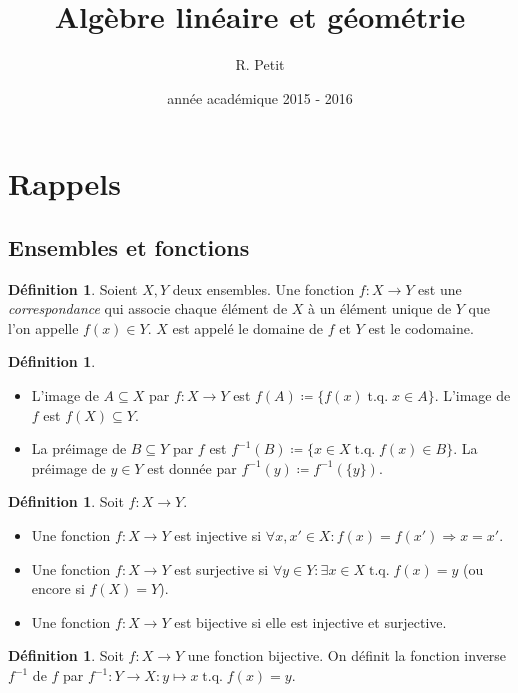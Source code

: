\documentclass{article}
\title{Algèbre linéaire et géométrie}
\author{R. Petit}
\date{année académique 2015 - 2016}
\DeclareMathOperator{\tq}{\text{ t.q. }}
\theoremstyle{definition}
\newtheorem{déf}[thm]{Définition}
\theoremstyle{remark}
\begin{document}
\maketitle
\tableofcontents
\newpage
{}

\section{Rappels}
	\subsection{Ensembles et fonctions}
		\begin{déf} Soient $X, Y$ deux ensembles. Une fonction $f : X \to Y$ est une \textit{correspondance} qui associe chaque élément de $X$ à un élément unique de $Y$
		que l'on appelle $f(x) \in Y$. $X$ est appelé le domaine de $f$ et $Y$ est le codomaine. \end{déf}

		\begin{déf}~
		\begin{itemize}
			\item L'image de $A \subseteq X$ par $f : X \to Y$ est $f(A) \coloneqq \{f(x) \tq x \in A\}$. L'image de $f$ est $f(X) \subseteq Y$.
			\item La préimage de $B \subseteq Y$ par $f$ est $f^{-1}(B) \coloneqq \{x \in X \tq f(x) \in B\}$. La préimage de $y \in Y$ est donnée par
			      $f^{-1}(y) \coloneqq f^{-1}(\{y\})$.
		\end{itemize}
		\end{déf}

		\begin{déf} Soit $f : X \to Y$.
		\begin{itemize}
			\item Une fonction $f : X \to Y$ est injective si $\forall x, x' \in X : f(x) = f(x') \Rightarrow x = x'$.
			\item Une fonction $f : X \to Y$ est surjective si $\forall y \in Y : \exists x \in X \tq f(x) = y$ (ou encore si $f(X) = Y$).
			\item Une fonction $f : X \to Y$ est bijective si elle est injective et surjective.
		\end{itemize}
		\end{déf}

		\begin{déf} Soit $f : X \to Y$ une fonction bijective. On définit la fonction inverse $f^{-1}$ de $f$ par $f^{-1} : Y \to X : y \mapsto x \tq f(x) = y$. \end{déf}
		
\end{document}
